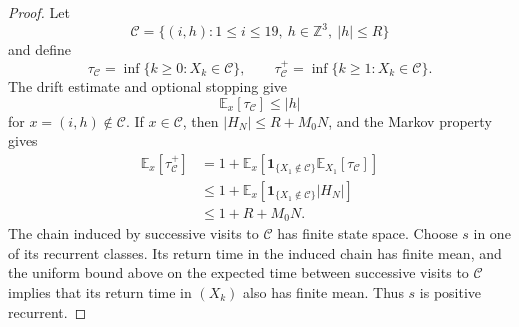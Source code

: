 \documentclass[10pt,a4paper]{amsart}
\newcommand{\Z}{\mathbb{Z}}
\begin{document}
\begin{proof}
Let
\[
\mathcal C=\{(i,h):1\leq i\leq19,\ h\in\Z^3,\ |h|\leq R\}
\]
and define
\[
\tau_{\mathcal C}=\inf\{k\geq0:X_k\in\mathcal C\},
\qquad
\tau_{\mathcal C}^+=\inf\{k\geq1:X_k\in\mathcal C\}.
\]
The drift estimate and optional stopping give
\[
\mathbb E_x\left[\tau_{\mathcal C}\right]\leq |h|
\]
for $x=(i,h)\notin\mathcal C$. If $x\in\mathcal C$, then $|H_N|\leq R+M_0N$, and the Markov property gives
\[
\begin{aligned}
\mathbb E_x\left[\tau_{\mathcal C}^+\right]
&=1+\mathbb E_x\left[
\mathbf 1_{\{X_1\notin\mathcal C\}}
\mathbb E_{X_1}\left[\tau_{\mathcal C}\right]
\right]\\
&\leq1+\mathbb E_x\left[
\mathbf 1_{\{X_1\notin\mathcal C\}}|H_N|
\right]\\
&\leq1+R+M_0N.
\end{aligned}
\]
The chain induced by successive visits to $\mathcal C$ has finite state space. Choose $s$ in one of its recurrent classes. Its return time in the induced chain has finite mean, and the uniform bound above on the expected time between successive visits to $\mathcal C$ implies that its return time in $(X_k)$ also has finite mean. Thus $s$ is positive recurrent.
\end{proof}
\end{document}
